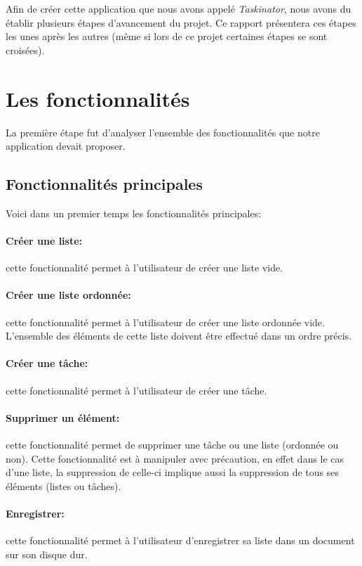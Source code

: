 \documentclass[a4paper,10pt]{article}
\begin{document}
Afin de créer cette application que nous avons appelé \textit{Taskinator}, nous avons du établir plusieurs étapes d'avancement du projet. Ce rapport présentera ces étapes les unes après les autres (même si lors de ce projet certaines étapes se sont croisées).

\newpage
\section{Les fonctionnalités}
La première étape fut d'analyser l'ensemble des fonctionnalités que notre application devait proposer. 

\subsection{Fonctionnalités principales}
Voici dans un premier temps les fonctionnalités principales:
\paragraph{Créer une liste:} cette fonctionnalité permet à l'utilisateur de créer une liste vide.
\paragraph{Créer une liste ordonnée:} cette fonctionnalité permet à l'utilisateur de créer une liste ordonnée vide. L'ensemble des éléments de cette liste doivent être effectué dans un ordre précis.
\paragraph{Créer une tâche:} cette fonctionnalité permet à l'utilisateur de créer une tâche.
\paragraph{Supprimer un élément:} cette fonctionnalité permet de supprimer une tâche ou une liste (ordonnée ou non). Cette fonctionnalité est à manipuler avec précaution, en effet dans le cas d'une liste, la suppression de celle-ci implique aussi la suppression de tous ses éléments (listes ou tâches).
\paragraph{Enregistrer:} cette fonctionnalité permet à l'utilisateur d'enregistrer sa liste dans un document sur son disque dur.
\end{document}
